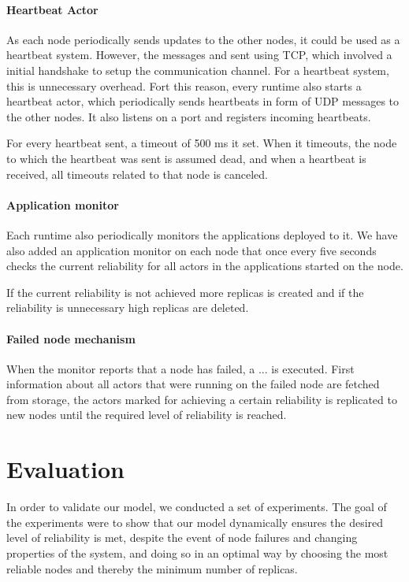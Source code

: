 \documentclass{cslthse-msc}
\begin{document}
\subsubsection{Heartbeat Actor}
As each node periodically sends updates to the other nodes, it could be used as a heartbeat system. However, the messages and sent using TCP, which involved a initial handshake to setup the communication channel. For a heartbeat system, this is unnecessary overhead. Fort this reason, every runtime also starts a heartbeat actor, which periodically sends heartbeats in form of UDP messages to the other nodes. It also listens on a port and registers incoming heartbeats.

For every heartbeat sent, a timeout of 500 ms it set. When it timeouts, the node to which the heartbeat was sent is assumed dead, and when a heartbeat is received, all timeouts related to that node is canceled.

\subsubsection{Application monitor}
Each runtime also periodically monitors the applications deployed to it. We have also added an application monitor on each node that once every five seconds checks the current reliability for all actors in the applications started on the node. 

If the current reliability is not achieved more replicas is created and if the reliability is unnecessary high replicas are deleted.

\subsubsection{Failed node mechanism}
When the monitor reports that a node has failed, a ... is executed. First information about all actors that were running on the failed node are fetched from storage, the actors marked for achieving a certain reliability is replicated to new nodes until the required level of reliability is reached. 


\chapter{Evaluation} \label{ch:evaluation}
In order to validate our model, we conducted a set of experiments. The goal of the experiments were to show that our model dynamically ensures the desired level of reliability is met, despite the event of node failures and changing properties of the system, and doing so in an optimal way by choosing the most reliable nodes and thereby the minimum number of replicas.
\end{document}
